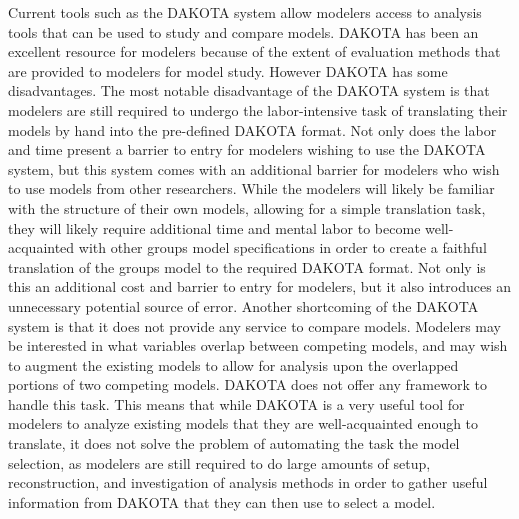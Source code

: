 Current tools such as the DAKOTA system \cite{adams2009dakota} allow modelers access to analysis tools that can be used to study and compare models. DAKOTA has been an excellent resource for modelers because of the extent of evaluation methods that are provided to modelers for model study. However DAKOTA has some disadvantages. The most notable disadvantage of the DAKOTA system is that modelers are still required to undergo the labor-intensive task of translating their models by hand into the pre-defined DAKOTA format. Not only does the labor and time present a barrier to entry for modelers wishing to use the DAKOTA system, but this system comes with an additional barrier for modelers who wish to use models from other researchers. While the modelers will likely be familiar with the structure of their own models, allowing for a simple translation task, they will likely require additional time and mental labor to become well-acquainted with other groups model specifications in order to create a faithful translation of the groups model to the required DAKOTA format. Not only is this an additional cost and barrier to entry for modelers, but it also introduces an unnecessary potential source of error. Another shortcoming of the DAKOTA system is that it does not provide any service to compare models. Modelers may be interested in what variables overlap between competing models, and may wish to augment the existing models to allow for analysis upon the overlapped portions of two competing models. DAKOTA does not offer any framework to handle this task. This means that while DAKOTA is a very useful tool for modelers to analyze existing models that they are well-acquainted enough to translate, it does not solve the problem of automating the task the model selection, as modelers are still required to do large amounts of setup, reconstruction, and investigation of analysis methods in order to gather useful information from DAKOTA that they can then use to select a model.

